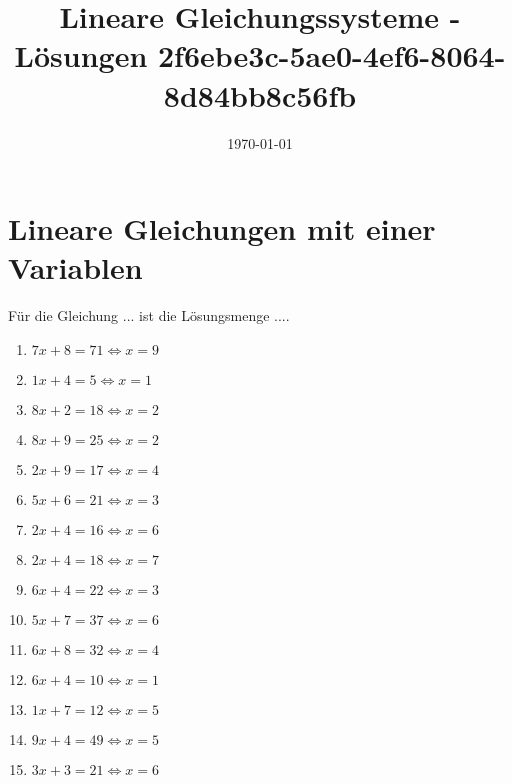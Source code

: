 \documentclass{article}%
\title{Lineare Gleichungssysteme - Lösungen \newline 2f6ebe3c-5ae0-4ef6-8064-8d84bb8c56fb}%
\date{\today}%
\begin{document}
%
\normalsize%
\maketitle%
\section{Lineare Gleichungen mit einer Variablen}%
\label{sec:LineareGleichungenmiteinerVariablen}%
Für die Gleichung ... ist die Lösungsmenge ....%
\begin{enumerate}[label=\alph*)]%
\item%
\newline\vspace{0.5cm}$7x+8=71\Leftrightarrow x=9$%
\item%
\newline\vspace{0.5cm}$1x+4=5\Leftrightarrow x=1$%
\item%
\newline\vspace{0.5cm}$8x+2=18\Leftrightarrow x=2$%
\item%
\newline\vspace{0.5cm}$8x+9=25\Leftrightarrow x=2$%
\item%
\newline\vspace{0.5cm}$2x+9=17\Leftrightarrow x=4$%
\item%
\newline\vspace{0.5cm}$5x+6=21\Leftrightarrow x=3$%
\item%
\newline\vspace{0.5cm}$2x+4=16\Leftrightarrow x=6$%
\item%
\newline\vspace{0.5cm}$2x+4=18\Leftrightarrow x=7$%
\item%
\newline\vspace{0.5cm}$6x+4=22\Leftrightarrow x=3$%
\item%
\newline\vspace{0.5cm}$5x+7=37\Leftrightarrow x=6$%
\item%
\newline\vspace{0.5cm}$6x+8=32\Leftrightarrow x=4$%
\item%
\newline\vspace{0.5cm}$6x+4=10\Leftrightarrow x=1$%
\item%
\newline\vspace{0.5cm}$1x+7=12\Leftrightarrow x=5$%
\item%
\newline\vspace{0.5cm}$9x+4=49\Leftrightarrow x=5$%
\item%
\newline\vspace{0.5cm}$3x+3=21\Leftrightarrow x=6$%
\end{enumerate}
\end{document}
